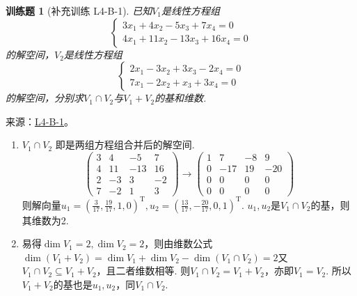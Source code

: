 \documentclass[12pt,fontset=fandol]{ctexart}
\newtheorem{exercise}{训练题}[section]
\begin{document}
\begin{exercise}[补充训练 L4-B-1]\label{prob:L4-B-1}
已知$V_1$是线性方程组\[\begin{cases}
                3x_1+4x_2-5x_3+7x_4=0 \\
                4x_1+11x_2-13x_3+16x_4=0
            \end{cases}\]
        的解空间，$V_2$是线性方程组\[\begin{cases}
                2x_1-3x_2+3x_3-2x_4=0 \\
                7x_1-2x_2+x_3+3x_4=0
            \end{cases}\]
        的解空间，分别求$V_1 \cap V_2$与$V_1+V_2$的基和维数.
\end{exercise}
\noindent 来源：\href{https://github.com/yhwu-is/Linear-Algebra-Left-Undone/blob/new/%E8%AE%B2%E4%B9%89/%E4%B8%93%E9%A2%98/4%20%E7%BA%BF%E6%80%A7%E7%A9%BA%E9%97%B4%E7%9A%84%E8%BF%90%E7%AE%97.tex}{L4-B-1}。
\begin{solve}
\begin{enumerate}
                \item $V_1\cap V_2$ 即是两组方程组合并后的解空间.
                      \[\begin{pmatrix}
                              3 & 4  & -5  & 7  \\
                              4 & 11 & -13 & 16 \\
                              2 & -3 & 3   & -2 \\
                              7 & -2 & 1   & 3
                          \end{pmatrix}\rightarrow
                          \begin{pmatrix}1 & 7   & -8 & 9   \\
                 0 & -17 & 19 & -20 \\
                 0 & 0   & 0  & 0   \\
                 0 & 0   & 0  & 0
                          \end{pmatrix}\]
                      则解向量$u_1=\left(\frac {3}{17},\frac{19}{17},1,0\right)^\mathrm{T},u_2=\left(\frac{13}{17},-\frac{20}{17},0,1\right)^\mathrm{T}$. $u_1,u_2$是$V_1\cap V_2$的基，则其维数为2.

                \item 易得$\dim V_1=2,\dim V_2=2$，则由维数公式$\dim (V_1+V_2)=\dim V_1+\dim V_2-\dim (V_1\cap V_2)= 2$又$V_1\cap V_2\subseteq V_1+V_2$，且二者维数相等. 则$V_1\cap V_2=V_1+V_2$，亦即$V_1=V_2$. 所以$V_1+V_2$的基也是$u_1,u_2$，同$V_1\cap V_2$.
            \end{enumerate}
\end{solve}
\end{document}
